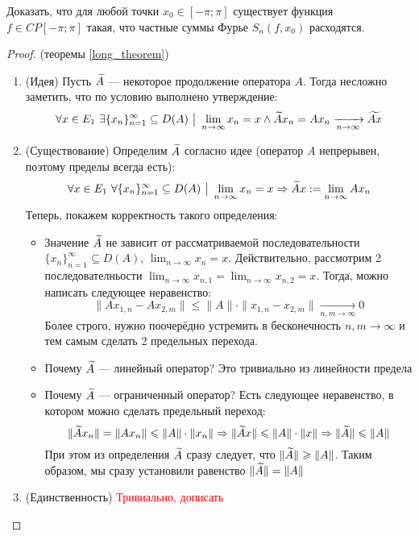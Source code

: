 \begin{exercise}
	Доказать, что для любой точки $x_0 \in [-\pi; \pi]$ существует функция $f \in CP[-\pi; \pi]$ такая, что частные суммы Фурье $S_n(f, x_0)$ расходятся.
\end{exercise}

\begin{proof} (теоремы \ref{long_theorem})
	\begin{enumerate}
		\item (Идея) Пусть $\widetilde{A}$ --- некоторое продолжение оператора $A$. Тогда несложно заметить, что по условию выполнено утверждение:
		\[
			\forall x \in E_1\ \exists \{x_n\}_{n = 1}^\infty \subseteq D(A) \ \big|\  \lim_{n \to \infty} x_n = x \wedge \widetilde{A}x_n = Ax_n \xrightarrow[n \to \infty]{} \widetilde{Ax}
		\]
		
		\item (Существование) Определим $\widetilde{A}$ согласно идее (оператор $A$ непрерывен, поэтому пределы всегда есть):
		\[
			\forall x \in E_1\ \forall \{x_n\}_{n = 1}^\infty \subseteq D(A) \ \big|\  \lim_{n \to \infty} x_n = x \Rightarrow \widetilde{A}x := \lim_{n \to \infty} Ax_n
		\]
		Теперь, покажем корректность такого определения:
		\begin{itemize}
			\item Значение $\widetilde{A}$ не зависит от рассматриваемой последовательности $\{x_n\}_{n = 1}^\infty \subseteq D(A)$, $\lim_{n \to \infty} x_n = x$. Действительно, рассмотрим 2 последователньости $\lim_{n \to \infty} x_{n, 1} = \lim_{n \to \infty} x_{n, 2} = x$. Тогда, можно написать следующее неравенство:
			\[
				\|Ax_{1, n} - Ax_{2, m}\| \le \|A\| \cdot \|x_{1, n} - x_{2, m}\| \xrightarrow[n, m \to \infty]{} 0
			\]
			Более строго, нужно поочерёдно устремить в бесконечность $n, m \to \infty$ и тем самым сделать 2 предельных перехода.
			
			\item Почему $\widetilde{A}$ --- линейный оператор? Это тривиально из линейности предела
			
			\item Почему $\widetilde{A}$ --- ограниченный оператор? Есть следующее неравенство, в котором можно сделать предельный переход:
			\[
				\|\widetilde{A}x_n\| = \|Ax_n\| \leqslant \|A\| \cdot \|x_n\| \Rightarrow \|\widetilde{A}x\| \leqslant \|A\| \cdot \|x\| \Rightarrow \|\widetilde{A}\| \leqslant \|A\|
			\]
			При этом из определения $\widetilde{A}$ сразу следует, что $\|\widetilde{A}\| \geqslant \|A\|$. Таким образом, мы сразу установили равенство $\|\widetilde{A}\| = \|A\|$
		\end{itemize}
	
		\item (Единственность) \textcolor{red}{Тривиально, дописать}
	\end{enumerate}
\end{proof}

